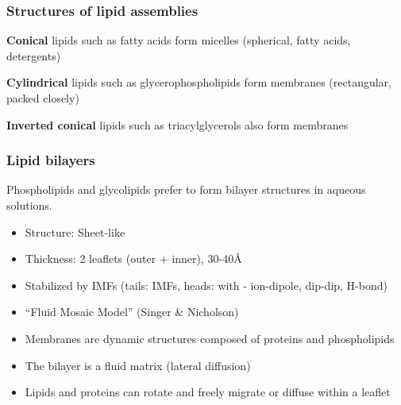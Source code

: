 \documentclass[letterpaper, 12pt]{article}
\begin{document}
\subsubsection*{Structures of lipid assemblies}
\textbf{Conical} lipids such as fatty acids form micelles (spherical, fatty acids, detergents)

\textbf{Cylindrical} lipids such as glycerophospholipids form membranes (rectangular, packed closely)

\textbf{Inverted conical} lipids such as triacylglycerols also form membranes 

\subsubsection*{Lipid bilayers}
Phospholipids and glycolipids prefer to form bilayer structures in aqueous solutions.

\begin{itemize}
\item Structure: Sheet-like
\item Thickness: 2 leaflets (outer + inner), 30-40Å
\item Stabilized by IMFs (tails: IMFs, heads: with  - ion-dipole, dip-dip, H-bond)
\item ``Fluid Mosaic Model'' (Singer \& Nicholson)
\item Membranes are dynamic structures composed of proteins and phospholipids
\item The bilayer is a fluid matrix (lateral diffusion)
\item Lipids and proteins can rotate and freely migrate or diffuse within a leaflet
\end{itemize}
\end{document}
